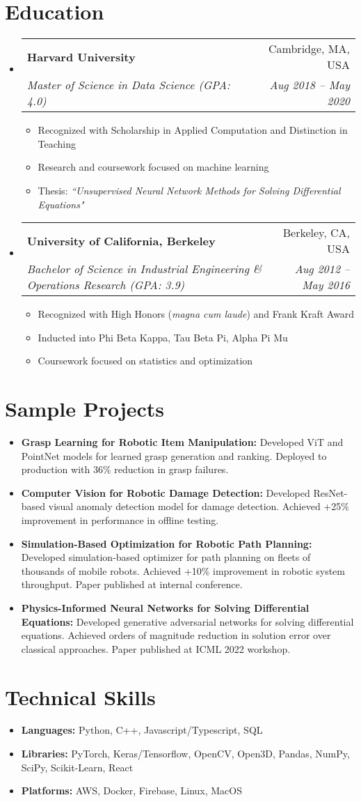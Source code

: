 \documentclass[a4paper,11pt]{article}
\makeatletter
\newcommand{\resumeItem}[1]{
  \item\small{#1}
}
\newcommand{\resumeItemListStart}{\begin{itemize}[rightmargin=0.11in]}
\newcommand{\resumeItemListEnd}{\end{itemize}}
\newcommand{\resumeQuadHeading}[4]{
  \item
  \begin{tabular*}{0.96\textwidth}[t]{l@{\extracolsep{\fill}}r}
    \textbf{#1} & #2 \\
    \textit{\small#3} & \textit{\small #4} \\
  \end{tabular*}
}
\newcommand{\resumeHeadingListStart}{
  \begin{itemize}[leftmargin=0.15in, label={}]
}
\newcommand{\resumeHeadingListEnd}{\end{itemize}}
\makeatother
\begin{document}
\section{Education}
  \resumeHeadingListStart{}
    \resumeQuadHeading{Harvard University}{Cambridge, MA, USA}
    {Master of Science in Data Science (GPA: 4.0)}{Aug 2018 -- May 2020}
    \resumeItemListStart{}
      \resumeItem{Recognized with Scholarship in Applied Computation and Distinction in Teaching}
      \resumeItem{Research and coursework focused on machine learning}
      \resumeItem{Thesis: \textit{``Unsupervised Neural Network Methods for Solving Differential Equations"}}
    \resumeItemListEnd{}
    \resumeQuadHeading{University of California, Berkeley}{Berkeley, CA, USA}
    {Bachelor of Science in Industrial Engineering \& Operations Research (GPA: 3.9)}{Aug 2012 -- May 2016}
    \resumeItemListStart{}
      \resumeItem{Recognized with High Honors (\textit{magna cum laude}) and Frank Kraft Award}
      \resumeItem{Inducted into Phi Beta Kappa, Tau Beta Pi, Alpha Pi Mu}
      \resumeItem{Coursework focused on statistics and optimization}
    \resumeItemListEnd{}
  \resumeHeadingListEnd{}


\section{Sample Projects}
    \resumeItemListStart{}
        \resumeItem{\textbf{Grasp Learning for Robotic Item Manipulation:} Developed ViT and PointNet models for learned grasp generation and ranking. Deployed to production with 36\% reduction in grasp failures.}
        \resumeItem{\textbf{Computer Vision for Robotic Damage Detection:} Developed ResNet-based visual anomaly detection model for damage detection. Achieved +25\% improvement in performance in offline testing.}
        \resumeItem{\textbf{Simulation-Based Optimization for Robotic Path Planning:} Developed simulation-based optimizer for path planning on fleets of thousands of mobile robots. Achieved +10\% improvement in robotic system throughput. Paper published at internal conference.}
        \resumeItem{\textbf{Physics-Informed Neural Networks for Solving Differential Equations:} Developed generative adversarial networks for solving differential equations. Achieved orders of magnitude reduction in solution error over classical approaches. Paper published at ICML 2022 workshop.}
    \resumeItemListEnd{}


\section{Technical Skills}
    \resumeItemListStart{}
        \resumeItem{\textbf{Languages:} Python, C++, Javascript/Typescript, SQL}
        \resumeItem{\textbf{Libraries:} PyTorch, Keras/Tensorflow, OpenCV, Open3D, Pandas, NumPy, SciPy, Scikit-Learn, React}
        \resumeItem{\textbf{Platforms:} AWS, Docker, Firebase, Linux, MacOS}
    \resumeItemListEnd{}
\end{document}
